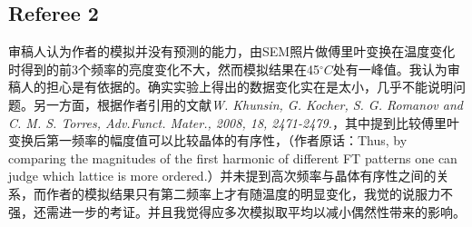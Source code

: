 \documentclass[a4paper,11pt]{article}
\begin{document}
\subsection{Referee 2}

审稿人认为作者的模拟并没有预测的能力，由SEM照片做傅里叶变换在温度变化时得到的前3个频率的亮度变化不大，然而模拟结果在45$^\circ C$处有一峰值。我认为审稿人的担心是有依据的。确实实验上得出的数据变化实在是太小，几乎不能说明问题。另一方面，根据作者引用的文献\textsl{W. Khunsin, G. Kocher, S. G. Romanov and C. M. S. Torres, Adv.Funct. Mater., 2008, 18, 2471-2479.}，其中提到比较傅里叶变换后第一频率的幅度值可以比较晶体的有序性，（作者原话：Thus, by comparing the magnitudes of the ﬁrst harmonic of different FT patterns one can judge which lattice is more ordered.）并未提到高次频率与晶体有序性之间的关系，而作者的模拟结果只有第二频率上才有随温度的明显变化，我觉的说服力不强，还需进一步的考证。并且我觉得应多次模拟取平均以减小偶然性带来的影响。
\end{document}
